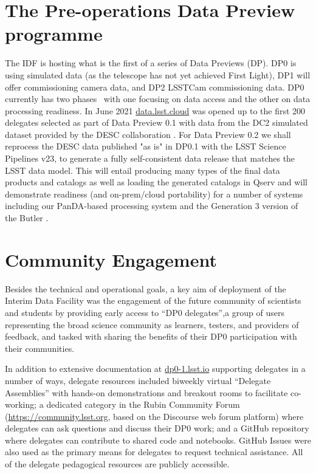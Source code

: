 \documentclass[11pt,twoside]{article}
\begin{document}
\section {The Pre-operations Data Preview programme}
The IDF is hosting what is the first of a series of Data Previews (DP). DP0 is using simulated data (as the telescope has not yet achieved First Light), DP1 will offer commissioning camera data,
and DP2 LSSTCam commissioning data.
DP0 currently has two phases~\citep{RTN-001} with one focusing on data access and the other on data processing readiness.
In June 2021 \href{https://data.lsst.cloud}{data.lsst.cloud} was opened up to the first 200 delegates selected as part of Data Preview 0.1 with data from the DC2 simulated dataset provided by the DESC collaboration \citep{arXiv:2010.05926}.
For Data Preview 0.2 we shall reprocess the DESC data published "as is" in DP0.1 with the LSST Science Pipelines v23, to generate a fully self-consistent data release that matches the LSST data model.
This will entail producing many types of the final data products and catalogs as well as loading the  generated catalogs in Qserv and will demonstrate readiness (and on-prem/cloud portability) for a number of systems including our PanDA-based processing system and the Generation 3 version of the Butler \citep{2019ASPC..523..653J}.

\section{Community Engagement }

Besides the technical and operational goals, a key aim of deployment of the Interim Data Facility was the engagement of the future community of scientists and students by providing early access to ``DP0 delegates'',a group of users representing the broad science community as learners, testers, and providers of feedback, and tasked with sharing the benefits of their DP0 participation with their communities.



In addition to extensive documentation at \href{https://dp0-1.lsst.io}{dp0-1.lsst.io} supporting delegates in a number of ways, delegate resources included biweekly virtual ``Delegate Assemblies'' with hands-on demonstrations and breakout rooms to facilitate co-working; a dedicated category in the Rubin Community Forum (\url{https://community.lsst.org}, based on the Discourse web forum platform) where delegates can ask questions and discuss their DP0 work; and a GitHub repository where delegates can contribute to shared code and notebooks.
GitHub Issues were also used as the primary means for delegates to request technical assistance. All of the delegate pedagogical resources are publicly accessible.
\end{document}
